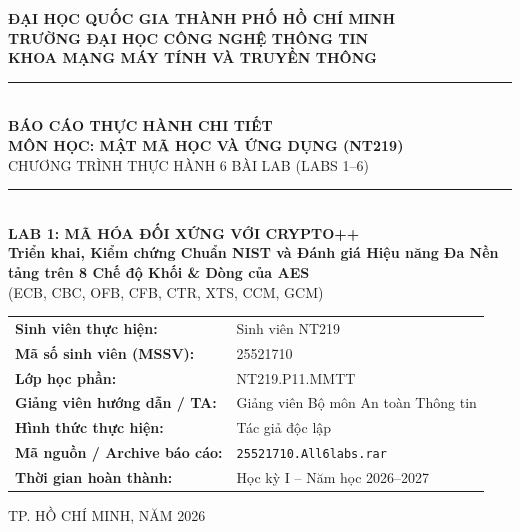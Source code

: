 \documentclass[12pt, a4paper]{report}
\newcommand{\studentname}{Sinh viên NT219}
\newcommand{\studentid}{25521710}
\newcommand{\classcode}{NT219.P11.MMTT}
\newcommand{\instructor}{Giảng viên Bộ môn An toàn Thông tin}
\newcommand{\groupmembers}{Tác giả độc lập}
\newcommand{\submissiondate}{Học kỳ I -- Năm học 2026--2027}
\newcommand{\archive}{25521710.All6labs.rar}
\begin{document}
\begin{titlepage}
\centering
\vspace*{0.5cm}

{\large\bfseries ĐẠI HỌC QUỐC GIA THÀNH PHỐ HỒ CHÍ MINH}\\[0.2cm]
{\large\bfseries TRƯỜNG ĐẠI HỌC CÔNG NGHỆ THÔNG TIN}\\[0.2cm]
{\large\bfseries KHOA MẠNG MÁY TÍNH VÀ TRUYỀN THÔNG}\\[1.5cm]

\rule{\linewidth}{1.0pt}\\[0.4cm]
{\LARGE\bfseries BÁO CÁO THỰC HÀNH CHI TIẾT}\\[0.3cm]
{\Large\bfseries MÔN HỌC: MẬT MÃ HỌC VÀ ỨNG DỤNG (NT219)}\\[0.2cm]
{\large CHƯƠNG TRÌNH THỰC HÀNH 6 BÀI LAB (LABS 1--6)}\\[0.4cm]
\rule{\linewidth}{1.0pt}\\[1.2cm]

{\LARGE\bfseries LAB 1: MÃ HÓA ĐỐI XỨNG VỚI CRYPTO++}\\[0.4cm]
{\large\bfseries Triển khai, Kiểm chứng Chuẩn NIST và Đánh giá Hiệu năng Đa Nền tảng trên 8 Chế độ Khối \& Dòng của AES}\\[0.2cm]
{\normalsize (ECB, CBC, OFB, CFB, CTR, XTS, CCM, GCM)}\\[1.8cm]

\begin{flushleft}
\large
\begin{tabular}{ll}
\textbf{Sinh viên thực hiện:} & \studentname \\
\textbf{Mã số sinh viên (MSSV):} & \studentid \\
\textbf{Lớp học phần:} & \classcode \\
\textbf{Giảng viên hướng dẫn / TA:} & \instructor \\
\textbf{Hình thức thực hiện:} & \groupmembers \\
\textbf{Mã nguồn / Archive báo cáo:} & \texttt{\archive} \\
\textbf{Thời gian hoàn thành:} & \submissiondate \\
\end{tabular}
\end{flushleft}

\vfill
{\normalsize TP. HỒ CHÍ MINH, NĂM 2026}
\end{titlepage}
\end{document}
